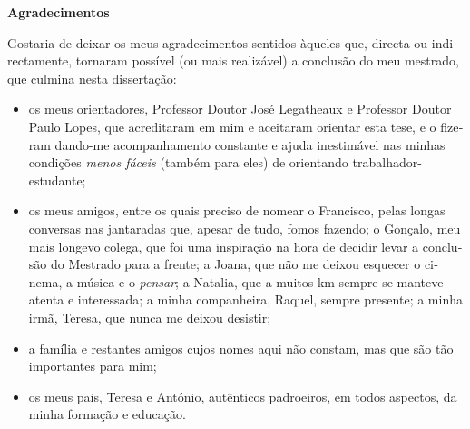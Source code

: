 
\cleardoublepage\thispagestyle{plain}

\begin{otherlanguage}{portuguese}
  \textbf{\Large Agradecimentos}

  Gostaria de deixar os meus agradecimentos sentidos àqueles que, directa ou indirectamente, tornaram possível (ou mais realizável) a conclusão do meu mestrado, que culmina nesta dissertação:
  \begin{itemize}
    \item os meus orientadores, Professor Doutor José Legatheaux e Professor Doutor Paulo Lopes, que acreditaram em mim e aceitaram orientar esta tese, e o fizeram dando-me acompanhamento constante e ajuda inestimável nas minhas condições \emph{menos fáceis} (também para eles) de orientando trabalhador-estudante;
    \item os meus amigos, entre os quais preciso de nomear o Francisco, pelas longas conversas nas jantaradas que, apesar de tudo, fomos fazendo; o Gonçalo, meu mais longevo colega, que foi uma inspiração na hora de decidir levar a conclusão do Mestrado para a frente; a Joana, que não me deixou esquecer o cinema, a música e o \emph{pensar}; a Natalia, que a muitos km sempre se manteve atenta e interessada; a minha companheira, Raquel, sempre presente; a minha irmã, Teresa, que nunca me deixou desistir;
    \item a família e restantes amigos cujos nomes aqui não constam, mas que são tão importantes para mim;
    \item os meus pais, Teresa e António, autênticos padroeiros, em todos aspectos, da minha formação e educação.
  \end{itemize}
\end{otherlanguage}
